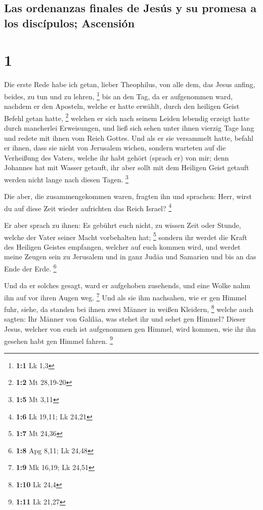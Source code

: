 \hypertarget{las-ordenanzas-finales-de-jesuxfas-y-su-promesa-a-los-discuxedpulos-ascensiuxf3n}{%
\subsection{Las ordenanzas finales de Jesús y su promesa a los
discípulos;
Ascensión}\label{las-ordenanzas-finales-de-jesuxfas-y-su-promesa-a-los-discuxedpulos-ascensiuxf3n}}

\hypertarget{section}{%
\section{1}\label{section}}

 Die erste Rede habe ich getan, lieber Theophilus, von
alle dem, das Jesus anfing, beides, zu tun und zu lehren, \footnote{\textbf{1:1}
  Lk 1,3}  bis an den Tag, da er aufgenommen ward, nachdem
er den Aposteln, welche er hatte erwählt, durch den heiligen Geist
Befehl getan hatte, \footnote{\textbf{1:2} Mt 28,19-20} 
welchen er sich nach seinem Leiden lebendig erzeigt hatte durch
mancherlei Erweisungen, und ließ sich sehen unter ihnen vierzig Tage
lang und redete mit ihnen vom Reich Gottes.  Und als er
sie versammelt hatte, befahl er ihnen, dass sie nicht von Jerusalem
wichen, sondern warteten auf die Verheißung des Vaters, welche ihr habt
gehört (sprach er) von mir;  denn Johannes hat mit Wasser
getauft, ihr aber sollt mit dem Heiligen Geist getauft werden nicht
lange nach diesen Tagen. \footnote{\textbf{1:5} Mt 3,11}

 Die aber, die zusammengekommen waren, fragten ihn und
sprachen: Herr, wirst du auf diese Zeit wieder aufrichten das Reich
Israel? \footnote{\textbf{1:6} Lk 19,11; Lk 24,21}

 Er aber sprach zu ihnen: Es gebührt euch nicht, zu wissen
Zeit oder Stunde, welche der Vater seiner Macht vorbehalten hat;
\footnote{\textbf{1:7} Mt 24,36}  sondern ihr werdet die
Kraft des Heiligen Geistes empfangen, welcher auf euch kommen wird, und
werdet meine Zeugen sein zu Jerusalem und in ganz Judäa und Samarien und
bis an das Ende der Erde. \footnote{\textbf{1:8} Apg 8,11; Lk 24,48}

 Und da er solches gesagt, ward er aufgehoben zusehends,
und eine Wolke nahm ihn auf vor ihren Augen weg. \footnote{\textbf{1:9}
  Mk 16,19; Lk 24,51}  Und als sie ihm nachsahen, wie er
gen Himmel fuhr, siehe, da standen bei ihnen zwei Männer in weißen
Kleidern, \footnote{\textbf{1:10} Lk 24,4}  welche auch
sagten: Ihr Männer von Galiläa, was stehet ihr und sehet gen Himmel?
Dieser Jesus, welcher von euch ist aufgenommen gen Himmel, wird kommen,
wie ihr ihn gesehen habt gen Himmel fahren. \footnote{\textbf{1:11} Lk
  21,27}

